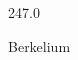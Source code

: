 \documentclass[12pt]{article}
\begin{document}
\hfill{}
\vfill
\begin{center}
  {\fontsize{50}{60}
  }

  \vspace{1em}

  247.0

Berkelium
\end{center}
\vfill
\end{document}
